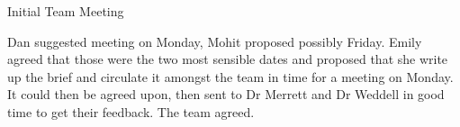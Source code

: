 \documentclass{article}
\begin{document}
\begin{Minutes}{Initial Team Meeting}

Dan suggested meeting on Monday, Mohit proposed possibly Friday. Emily
agreed that those were the two most sensible dates and proposed that she
write up the brief and circulate it amongst the team in time for a
meeting on Monday. It could then be agreed upon, then sent to Dr Merrett
and Dr Weddell in good time to get their feedback. The team agreed.


\end{Minutes}
\end{document}
